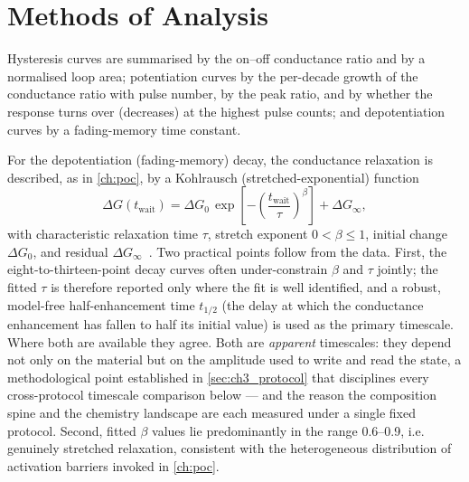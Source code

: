 \documentclass[12pt, twoside]{report}
\begin{document}
\section{Methods of Analysis}\label{sec:ch3_methods}

Hysteresis curves are summarised by the on--off conductance ratio and by a normalised loop area; potentiation curves by the per-decade growth of the conductance ratio with pulse number, by the peak ratio, and by whether the response turns over (decreases) at the highest pulse counts; and depotentiation curves by a fading-memory time constant.

For the depotentiation (fading-memory) decay, the conductance relaxation is described, as in \cref{ch:poc}, by a Kohlrausch (stretched-exponential) function
\begin{equation}
  \label{eq:ch3_kohlrausch}
  \Delta G(t_{\mathrm{wait}}) = \Delta G_0\,\exp\!\left[-\left(\frac{t_{\mathrm{wait}}}{\tau}\right)^{\beta}\right] + \Delta G_\infty,
\end{equation}
with characteristic relaxation time \(\tau\), stretch exponent \(0 < \beta \le 1\), initial change \(\Delta G_0\), and residual \(\Delta G_\infty\)~\cite{Sturman2003}. Two practical points follow from the data. First, the eight-to-thirteen-point decay curves often under-constrain \(\beta\) and \(\tau\) jointly; the fitted \(\tau\) is therefore reported only where the fit is well identified, and a robust, model-free half-enhancement time \(t_{1/2}\) (the delay at which the conductance enhancement has fallen to half its initial value) is used as the primary timescale. Where both are available they agree. Both are \emph{apparent} timescales: they depend not only on the material but on the amplitude used to write and read the state, a methodological point established in \cref{sec:ch3_protocol} that disciplines every cross-protocol timescale comparison below --- and the reason the composition spine and the chemistry landscape are each measured under a single fixed protocol. Second, fitted \(\beta\) values lie predominantly in the range \numrange{0.6}{0.9}, i.e. genuinely stretched relaxation, consistent with the heterogeneous distribution of activation barriers invoked in \cref{ch:poc}.
\end{document}
